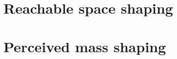 \section{Reachable space shaping}
\label{ch:human_robot_reachable_space}


\section{Perceived mass shaping}
\label{ch:human_robot_percieved_mass}

